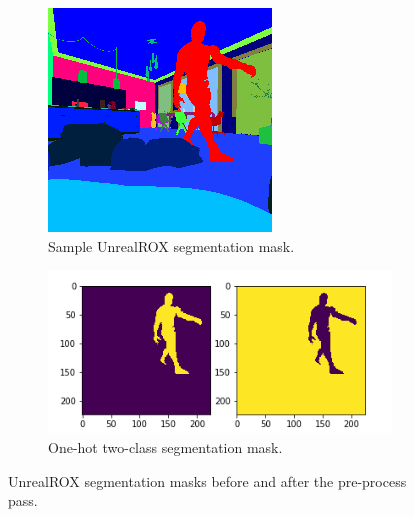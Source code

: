 \begin{figure}[!ht]
	\centering
	\begin{subfigure}[b]{0.4\textwidth}
		\includegraphics[width=1\linewidth]{archivos/rox_mask.png}
		\caption{Sample UnrealROX segmentation mask.}
	\end{subfigure}
	
	\begin{subfigure}[b]{0.6\textwidth}
		\includegraphics[width=1\linewidth]{archivos/onehot_mask.png}
		\caption{One-hot two-class segmentation mask.}
	\end{subfigure}
	
	\caption{UnrealROX segmentation masks before and after the pre-process pass.}
	\label{fig:rox-onehot}
\end{figure}

